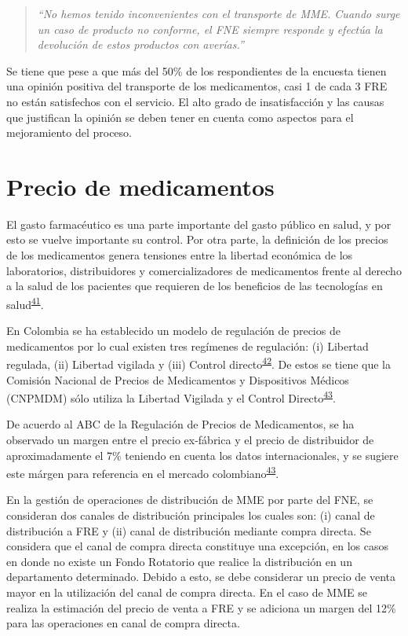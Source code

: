 \documentclass[
]{book}
\begin{document}
\begin{quote}
\emph{``No hemos tenido inconvenientes con el transporte de MME. Cuando surge un caso de producto no conforme, el FNE siempre responde y efectúa la devolución de estos productos con averías.''}
\end{quote}

Se tiene que pese a que más del 50\% de los respondientes de la encuesta tienen una opinión positiva del transporte de los medicamentos, casi 1 de cada 3 FRE no están satisfechos con el servicio. El alto grado de insatisfacción y las causas que justifican la opinión se deben tener en cuenta como aspectos para el mejoramiento del proceso.

\hypertarget{precioMedicamentos}{%
\section{Precio de medicamentos}\label{precioMedicamentos}}


El gasto farmacéutico es una parte importante del gasto público en salud, y por esto se vuelve importante su control. Por otra parte, la definición de los precios de los medicamentos genera tensiones entre la libertad económica de los laboratorios, distribuidores y comercializadores de medicamentos frente al derecho a la salud de los pacientes que requieren de los beneficios de las tecnologías en salud\textsuperscript{\protect\hyperlink{ref-AvilaRoncancio2019}{41}}.

En Colombia se ha establecido un modelo de regulación de precios de medicamentos por lo cual existen tres regímenes de regulación: (i) Libertad regulada, (ii) Libertad vigilada y (iii) Control directo\textsuperscript{\protect\hyperlink{ref-CongresodelaRepublicadeColombia1988}{42}}. De estos se tiene que la Comisión Nacional de Precios de Medicamentos y Dispositivos Médicos (CNPMDM) sólo utiliza la Libertad Vigilada y el Control Directo\textsuperscript{\protect\hyperlink{ref-SecretariaTecnicaCNPDM-2019}{43}}.

De acuerdo al ABC de la Regulación de Precios de Medicamentos, se ha observado un margen entre el precio ex-fábrica y el precio de distribuidor de aproximadamente el 7\% teniendo en cuenta los datos internacionales, y se sugiere este márgen para referencia en el mercado colombiano\textsuperscript{\protect\hyperlink{ref-SecretariaTecnicaCNPDM-2019}{43}}.

En la gestión de operaciones de distribución de MME por parte del FNE, se consideran dos canales de distribución principales los cuales son: (i) canal de distribución a FRE y (ii) canal de distribución mediante compra directa. Se considera que el canal de compra directa constituye una excepción, en los casos en donde no existe un Fondo Rotatorio que realice la distribución en un departamento determinado. Debido a esto, se debe considerar un precio de venta mayor en la utilización del canal de compra directa. En el caso de MME se realiza la estimación del precio de venta a FRE y se adiciona un margen del 12\% para las operaciones en canal de compra directa.
\end{document}
